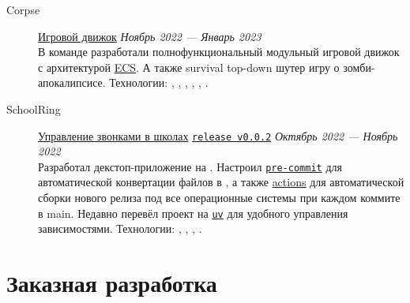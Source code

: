\documentclass[margin,line]{resume}
\begin{document}
\begin{resume}
\begin{description}
      \vspace{3mm}

    \item[Corpse]\small{\href{https://github.com/corpse-inc/corpse}{Игровой
        движок}
      \hfill \textsl{Ноябрь 2022 — Январь 2023\vspace{1mm}}}\\
      В команде разработали полнофункциональный модульный
      игровой движок с архитектурой
      \href{https://en.wikipedia.org/wiki/Entity_component_system#:~:text=Entity%E2%80%93component%E2%80%93system%20(ECS,Entity%E2%80%93Component%E2%80%93System%20layout.}{ECS}.
        А также survival top-down шутер игру о зомби-апокалипсисе.
        Технологии:
        , ,
        , , ,
        .

        \vspace{3mm}

      \item[SchoolRing]\small{\href{https://github.com/alchemmist/school-ring}{Управление
          звонками в школах}
          \begingroup
          \hypersetup{urlcolor=blue!30}
          \href{https://github.com/}{\texttt{release v0.0.2}}
          \endgroup
          \hfill
        \textsl{Октябрь 2022 — Ноябрь 2022\vspace{1mm}}}\\
        Разработал декстоп-приложение на . Настроил
        \href{https://github.com}{\texttt{pre-commit}} для
        автоматической конвертации  файлов в
        , а также \href{https://github.com}{actions}
        для автоматической сборки нового релиза под все
        операционные системы при каждом коммите в main. Недавно перевёл
        проект на \href{https://astral.sh/blog/uv}{\texttt{uv}} для
        удобного управления зависимостями.
        Технологии:
        , ,
        , .

    \end{description}

    \section{\mysidestyle Заказная разработка}\vspace{2mm}


\end{resume}
\end{document}
